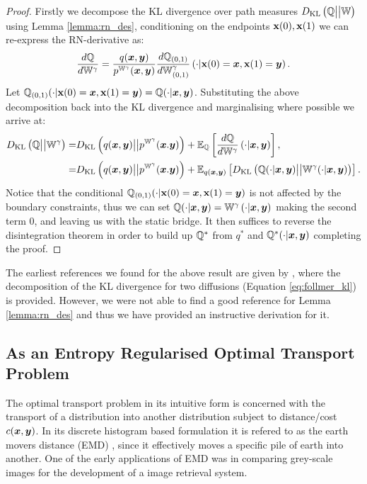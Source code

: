 \documentclass[a4paper,12pt,twoside,openright]{report}
\theoremstyle{definition}
\begin{document}
\begin{proof}
Firstly we decompose the KL divergence over path measures $D_{\mathrm{KL}}\left({\mathbb{Q}} \big|\big| \mathbb{W}\right)$ using Lemma \ref{lemma:rn_des}, conditioning on the endpoints ${\mathbf{x}}(0), {\mathbf{x}}(1)$ we can re-express the RN-derivative as:
\begin{align}
    \frac{d{\mathbb{Q}}}{d\mathbb{W}^\gamma} = \frac{q({\bm{x}}, {\bm{y}})}{p^{\mathbb{W}^{\gamma}}({\bm{x}}, {\bm{y}})}\frac{d{\mathbb{Q}}_{(0,1)}}{d\mathbb{W}_{(0,1)}^\gamma}\left(\cdot | {\mathbf{x}}(0) ={\bm{x}}, {\mathbf{x}}(1) ={\bm{y}}\right).
\end{align}
Let ${\mathbb{Q}}_{(0,1)}(\cdot |  {\mathbf{x}}(0) ={\bm{x}}, {\mathbf{x}}(1) ={\bm{y}}) = {\mathbb{Q}}(\cdot |  {\bm{x}},{\bm{y}})$. Substituting the above decomposition back into the KL divergence and marginalising where possible we arrive at: 
\begin{align} \label{eq:follmer_kl}
    D_{\mathrm{KL}}\left({\mathbb{Q}} \big|\big| \mathbb{W}^{\gamma}\right) =&  D_{\mathrm{KL}}\left(q({\bm{x}}, {\bm{y}}) \big|\big| p^{\mathbb{W}^{\gamma}}({\bm{x}}. {\bm{y}}) \right)  + \mathbb{E}_{{\mathbb{Q}}}\left[\frac{d{\mathbb{Q}}}{d\mathbb{W}^\gamma}\left(\cdot | {\bm{x}}, {\bm{y}}\right)\right], \nonumber \\
    =&  D_{\mathrm{KL}}\left(q({\bm{x}}, {\bm{y}}) \big|\big| p^{\mathbb{W}^{\gamma}}({\bm{x}}. {\bm{y}}) \right)  + \mathbb{E}_{q({\bm{x}},{\bm{y}})}\left[D_{\mathrm{KL}}\left({\mathbb{Q}}(\cdot |  {\bm{x}},{\bm{y}})\big|\big|\mathbb{W}^{\gamma}(\cdot |  {\bm{x}},{\bm{y}})\right)\right].
\end{align}
Notice that the conditional ${\mathbb{Q}}_{(0,1)}(\cdot |  {\mathbf{x}}(0) ={\bm{x}}, {\mathbf{x}}(1) ={\bm{y}})$ is not affected by the boundary constraints, thus we can set ${\mathbb{Q}}(\cdot | {\bm{x}},{\bm{y}}) = \mathbb{W}^\gamma\left(\cdot | {\bm{x}}, {\bm{y}}\right)$ making the second term 0, and leaving us with the static bridge. It then suffices to reverse the disintegration theorem in order to build up ${\mathbb{Q}}^{*}$ from $q^{*}$ and ${\mathbb{Q}}^{*}(\cdot | {\bm{x}},{\bm{y}})$ completing the proof.
\end{proof}

The earliest references we found for the above result are given by \cite{follmer1988random}, where the decomposition of the KL divergence for two diffusions (Equation \ref{eq:follmer_kl}) is provided. However, we were not able to find a good reference for Lemma \ref{lemma:rn_des} and thus we have provided an instructive derivation for it.
\subsection{As an Entropy Regularised Optimal Transport Problem}

The optimal transport problem in its intuitive form is concerned with the transport of a distribution into another distribution subject to distance/cost $c({\bm{x}},{\bm{y}})$. In its discrete histogram based formulation it is refered to as the earth movers distance (EMD) \citep{levina2001earth}, since it effectively moves a specific pile of earth into another. One of the early applications of EMD was in comparing grey-scale images for the development of a image retrieval system. 
\end{document}
